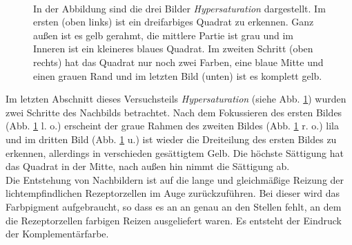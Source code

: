 \documentclass[11pt]{article}
\begin{document}
\begin{figure}[H]
\\ 
\makebox[0.25\textwidth][c]{}
\caption{In der Abbildung sind die drei Bilder \textit{Hypersaturation} dargestellt. Im ersten (oben links) ist ein dreifarbiges Quadrat zu erkennen. Ganz außen ist es gelb gerahmt, die mittlere Partie ist grau und im Inneren ist ein kleineres blaues Quadrat. Im zweiten Schritt (oben rechts) hat das Quadrat nur noch zwei Farben, eine blaue Mitte und einen grauen Rand und im letzten Bild (unten) ist es komplett gelb.}
\label{hypersat}
\end{figure}

Im letzten Abschnitt dieses Versuchsteils \textit{Hypersaturation} (siehe Abb. \ref{hypersat}) wurden zwei Schritte des Nachbilds betrachtet. Nach dem Fokussieren des ersten Bildes (Abb. \ref{hypersat} l. o.) erscheint der graue Rahmen des zweiten Bildes (Abb. \ref{hypersat} r. o.) lila und im dritten Bild (Abb. \ref{hypersat} u.) ist wieder die Dreiteilung des ersten Bildes zu erkennen, allerdings in verschieden gesättigtem Gelb. Die höchste Sättigung hat das Quadrat in der Mitte, nach außen hin nimmt die Sättigung ab. \\

Die Entstehung von Nachbildern ist auf die lange und gleichmäßige Reizung der lichtempfindlichen Rezeptorzellen im Auge zurückzuführen. Bei dieser wird das Farbpigment aufgebraucht, so dass es an an genau an den Stellen fehlt, an dem die Rezeptorzellen farbigen Reizen ausgeliefert waren. Es entsteht der Eindruck der Komplementärfarbe.
\end{document}
